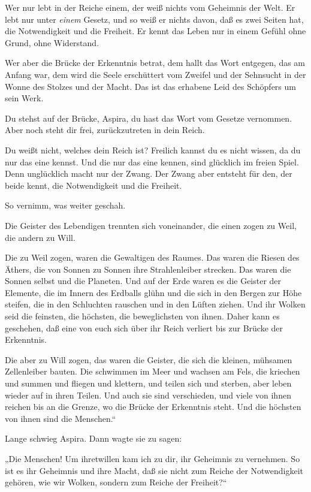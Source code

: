 Wer nur lebt in der Reiche einem, der weiß nichts vom Geheimnis der
Welt. Er lebt nur unter \emph{einem} Gesetz, und so weiß er nichts
davon, daß es zwei Seiten hat, die Notwendigkeit und die Freiheit.
Er kennt das Leben nur in einem Gefühl ohne Grund, ohne
Widerstand.

Wer aber die Brücke der Erkenntnis betrat, dem hallt das Wort
entgegen, das am Anfang war, dem wird die Seele erschüttert vom
Zweifel und der Sehnsucht in der Wonne des Stolzes und der Macht.
Das ist das erhabene Leid des Schöpfers um sein Werk.

Du stehst auf der Brücke, Aspira, du hast das Wort vom Gesetze
vernommen. Aber noch steht dir frei, zurückzutreten in dein Reich.

Du weißt nicht, welches dein Reich ist? Freilich kannst du es nicht
wissen, da du nur das eine kennst. Und die nur das eine kennen,
sind glücklich im freien Spiel. Denn unglücklich macht nur der
Zwang. Der Zwang aber entsteht für den, der beide kennt, die
Notwendigkeit und die Freiheit.

So vernimm, was weiter geschah.

Die Geister des Lebendigen trennten sich voneinander, die einen
zogen zu Weil, die andern zu Will.

Die zu Weil zogen, waren die Gewaltigen des Raumes. Das waren die
Riesen des Äthers, die von Sonnen zu Sonnen ihre Strahlenleiber
strecken. Das waren die Sonnen selbst und die Planeten. Und auf der
Erde waren es die Geister der Elemente, die im Innern des Erdballs
glühn und die sich in den Bergen zur Höhe steifen, die in den
Schluchten rauschen und in den Lüften ziehen. Und ihr Wolken seid
die feinsten, die höchsten, die beweglichsten von ihnen. Daher kann
es geschehen, daß eine von euch sich über ihr Reich verliert bis
zur Brücke der Erkenntnis.

Die aber zu Will zogen, das waren die Geister, die sich die
kleinen, mühsamen Zellenleiber bauten. Die schwimmen im Meer und
wachsen am Fels, die kriechen und summen und fliegen und klettern,
und teilen sich und sterben, aber leben wieder auf in ihren Teilen.
Und auch sie sind verschieden, und viele von ihnen reichen bis an
die Grenze, wo die Brücke der Erkenntnis steht. Und die höchsten
von ihnen sind die Menschen.“

Lange schwieg Aspira. Dann wagte sie zu sagen:

„Die Menschen! Um ihretwillen kam ich zu dir, ihr Geheimnis zu
vernehmen. So ist es ihr Geheimnis und ihre Macht, daß sie nicht
zum Reiche der Notwendigkeit gehören, wie wir Wolken, sondern zum
Reiche der Freiheit?“

